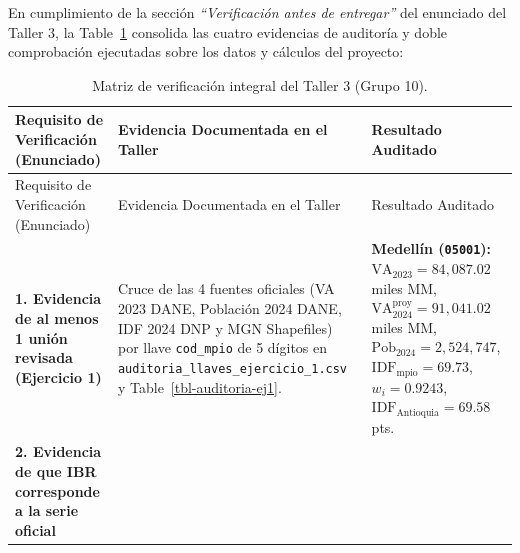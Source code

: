 \documentclass[
  10pt,
  letterpaper,
  DIV=11,
  numbers=noendperiod]{scrartcl}
\begin{document}
En cumplimiento de la sección \emph{``Verificación antes de entregar''}
del enunciado del Taller 3, la Table~\ref{tbl-matriz-verificacion-final}
consolida las cuatro evidencias de auditoría y doble comprobación
ejecutadas sobre los datos y cálculos del proyecto:

\begin{longtable}[]{@{}
  >{\raggedright\arraybackslash}p{}
  >{\raggedright\arraybackslash}p{}
  >{\raggedright\arraybackslash}p{}@{}}
\caption{Matriz de verificación integral del Taller 3 (Grupo
10).}\label{tbl-matriz-verificacion-final}\tabularnewline
\toprule\noalign{}
\begin{minipage}[b]{\linewidth}\raggedright
Requisito de Verificación (Enunciado)
\end{minipage} & \begin{minipage}[b]{\linewidth}\raggedright
Evidencia Documentada en el Taller
\end{minipage} & \begin{minipage}[b]{\linewidth}\raggedright
Resultado Auditado
\end{minipage} \\
\midrule\noalign{}
\endfirsthead
\toprule\noalign{}
\begin{minipage}[b]{\linewidth}\raggedright
Requisito de Verificación (Enunciado)
\end{minipage} & \begin{minipage}[b]{\linewidth}\raggedright
Evidencia Documentada en el Taller
\end{minipage} & \begin{minipage}[b]{\linewidth}\raggedright
Resultado Auditado
\end{minipage} \\
\midrule\noalign{}
\endhead
\bottomrule\noalign{}
\endlastfoot
\textbf{1. Evidencia de al menos 1 unión revisada (Ejercicio 1)} & Cruce
de las 4 fuentes oficiales (VA 2023 DANE, Población 2024 DANE, IDF 2024
DNP y MGN Shapefiles) por llave \texttt{cod\_mpio} de 5 dígitos en
\texttt{auditoria\_llaves\_ejercicio\_1.csv} y
Table~\ref{tbl-auditoria-ej1}. & \textbf{Medellín (\texttt{05001}):}
\(\text{VA}_{2023} = 84,087.02\) miles MM,
\(\text{VA}_{2024}^{\text{proy}} = 91,041.02\) miles MM,
\(\text{Pob}_{2024} = 2,524,747\), \(\text{IDF}_{\text{mpio}} = 69.73\),
\(w_i = 0.9243\), \(\text{IDF}_{\text{Antioquia}} = 69.58\) pts. \\
\textbf{2. Evidencia de que IBR corresponde a la serie oficial
}
\end{longtable}
\end{document}
